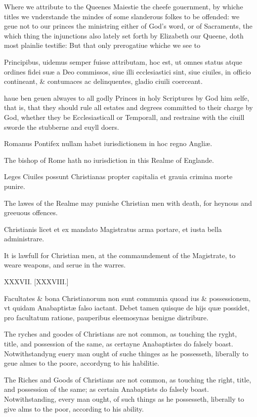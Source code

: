 Where we attribute to the Queenes Maiestie the cheefe gouernment, by whiche titles we vnderstande the mindes of some slanderous folkes to be offended: we geue not to our princes the ministring either of God's word, or of Sacraments, the which thing the injunctions also lately set forth by Elizabeth our Queene, doth most plainlie testifie: But that only prerogatiue whiche we see to

Principibus, uidemus semper fuisse attributam, hoc est, ut omnes status atque ordines fidei suæ a Deo commissos, siue illi ecclesiastici sint, siue ciuiles, in officio contineant, \& contumaces ac delinquentes, gladio ciuili coerceant.

haue ben geuen alwayes to all godly Princes in holy Scriptures by God him selfe, that is, that they should rule all estates and degrees committed to their charge by God, whether they be Ecclesiasticall or Temporall, and restraine with the ciuill sworde the stubberne and euyll doers.

Romanus Pontifex nullam habet iurisdictionem in hoc regno Angliæ.

The bishop of Rome hath no iurisdiction in this Realme of Englande.

Leges Ciuiles possunt Christianas propter capitalia et grauia crimina morte punire.

The lawes of the Realme may punishe Christian men with death, for heynous and greeuous offences.

Christianis licet et ex mandato Magistratus arma portare, et iusta bella administrare.

It is lawfull for Christian men, at the commaundement of the Magistrate, to weare weapons, and serue in the warres.

XXXVII. [XXXVIII.]


Facultates \& bona Christianorum non sunt communia quoad ius \& possessionem, vt quidam Anabaptistæ falso iactant. Debet tamen quisque de hijs quæ possidet, pro facultatum ratione, pauperibus eleemosynas benigne distribure.

The ryches and goodes of Christians are not common, as touching the ryght, title, and possession of the same, as certayne Anabaptistes do falsely boast. Notwithstandyng euery man ought of suche thinges as he possesseth, liberally to geue almes to the poore, accordyng to his habilitie.

The Riches and Goods of Christians are not common, as touching the right, title, and possession of the same; as certain Anabaptists do falsely boast. Notwithstanding, every man ought, of such things as he possesseth, liberally to give alms to the poor, according to his ability.


